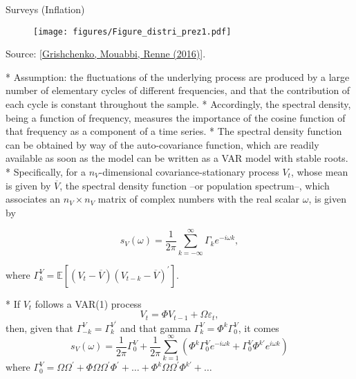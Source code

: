 {Surveys (Inflation)}
\begin{figure}
	\texttt{[image: figures/Figure\_distri\_prez1.pdf]}
\end{figure}
\begin{center}

Source: [\href{XXX}{Grishchenko, Mouabbi, Renne (2016)}].

\end{center}



{}\label{slide:spectral}

\hyperlink{slide:MFA}{}


	* Assumption: the fluctuations of
the underlying process are produced by a large number of elementary
cycles of different frequencies, and that the contribution of each
cycle is constant throughout the sample.
* Accordingly, the {\color{blue}spectral
density}, being a function of frequency, measures the importance of
the cosine function of that frequency as a component of a time series.
* The spectral density function can be obtained by way of the auto-covariance
function, which are readily available as soon as the model can be
written as a VAR model with stable roots.
* Specifically, for a $n_{V}$-dimensional covariance-stationary process $V_{t}$,
whose mean is given by $\overline{V}$, the spectral density function
--or population spectrum--, which associates an $n_{V}\times n_{V}$
matrix of complex numbers with the real scalar $\omega$, is given
by 

\[
s_{V}(\omega)=\frac{1}{2\pi}\sum_{k=-\infty}^{\infty}\Gamma_{k}e^{-i\omega k},
\]
 

where $\Gamma_{k}^{V}=\mathbb{E}\left[\left(V_{t}-\overline{V}\right)\left(V_{t-k}-\overline{V}\right)^{\prime}\right]$.






{}\label{slide:spectral}

\hyperlink{slide:MFA}{}



* If $V_{t}$ follows a VAR(1) process 
\[
V_{t}=\Phi V_{t-1}+\Omega\varepsilon_{t},
\]
then, given that $\Gamma_{-k}^{V}=\Gamma_{k}^{V^{\prime}}$ and that
gamma $\Gamma_{k}^{V}=\Phi^{k}\Gamma_{0}^{V}$, it comes 
\[
s_{V}(\omega)=\frac{1}{2\pi}\Gamma_{0}^{V}+\frac{1}{2\pi}\sum\limits _{k=1}^{\infty}(\Phi^{k}\Gamma_{0}^{V}e^{-i\omega k}+\Gamma_{0}^{V}\Phi^{k\prime}e^{i\omega k})
\]
where $\Gamma_{0}^{V}=\Omega\Omega^{\prime}+\Phi\Omega\Omega^{\prime}\Phi^{\prime}+\ldots+\Phi^{k}\Omega\Omega^{\prime}\Phi^{k\prime}+\ldots$

